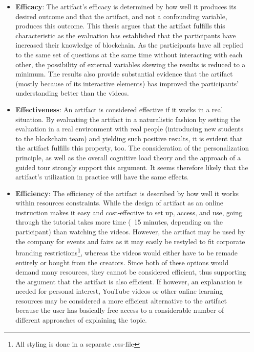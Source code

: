 \begin{itemize}
    \item \textbf{Efficacy}: The artifact's efficacy is determined by how well it produces its desired outcome and that the artifact, and not a confounding variable, produces this outcome. This thesis argues that the artifact fulfills this characteristic as the evaluation has established that the participants have increased their knowledge of blockchain. As the participants have all replied to the same set of questions at the same time without interacting with each other, the possibility of external variables skewing the results is reduced to a minimum. The results also provide substantial evidence that the artifact (mostly because of its interactive elements) has improved the participants' understanding better than the videos.
    \item \textbf{Effectiveness}: An artifact is considered effective if it works in a real situation. By evaluating the artifact in a naturalistic fashion by setting the evaluation in a real environment with real people (introducing new students to the blockchain team) and yielding such positive results, it is evident that the artifact fulfills this property, too. The consideration of the personalization principle, as well as the overall cognitive load theory and the approach of a guided tour strongly support this argument. It seems therefore likely that the artifact's utilization in practice will have the same effects.
    \item \textbf{Efficiency}: The efficiency of the artifact is described by how well it works within resources constraints. While the design of artifact as an online instruction makes it easy and cost-effective to set up, access, and use, going through the tutorial takes more time (~15 minutes, depending on the participant) than watching the videos. However, the artifact may be used by the company for events and fairs as it may easily be restyled to fit corporate branding restrictions\footnote{All styling is done in a separate .css-file}, whereas the videos would either have to be remade entirely or bought from the creators. Since both of these options would demand many resources, they cannot be considered efficient, thus supporting the argument that the artifact is also efficient. If however, an explanation is needed for personal interest, YouTube videos or other online learning resources may be considered a more efficient alternative to the artifact because the user has basically free access to a considerable number of different approaches of explaining the topic.

\end{itemize}
